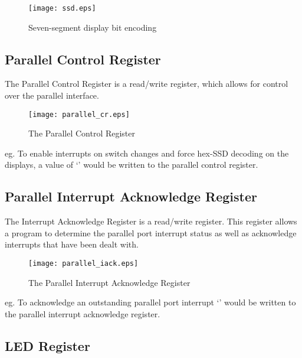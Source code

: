 \begin{figure}[h]
\begin{center}
\texttt{[image: ssd.eps]}
\caption{Seven-segment display bit encoding}
\label{fig:ssd}
\end{center}
\end{figure}

\subsection{Parallel Control Register}

The Parallel Control Register is a read/write register, which allows
for control over the parallel interface.

\begin{figure}[h]
\begin{center}
\texttt{[image: parallel\_cr.eps]}
\caption{The Parallel Control Register}
\label{parallel_cr_pic}
\end{center}
\end{figure}

eg. To enable interrupts on switch changes and force hex-SSD decoding
on the displays, a value of `' would be written to
the parallel control register.

\subsection{Parallel Interrupt Acknowledge Register}

The Interrupt Acknowledge Register is a read/write register. This
register allows a program to determine the parallel port interrupt
status as well as acknowledge interrupts that have been dealt with.

\begin{figure}[h]
\begin{center}
\texttt{[image: parallel\_iack.eps]}
\caption{The Parallel Interrupt Acknowledge Register}
\label{parallel_iack_pic}
\end{center}
\end{figure}

eg. To acknowledge an outstanding parallel port interrupt `'
would be written to the parallel interrupt acknowledge register.


\subsection{LED Register}

